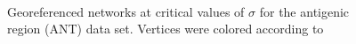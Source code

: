 \documentclass[12pt]{article}
\begin{document}
\begin{figure}[t]
\\
\caption{\footnotesize Georeferenced networks at critical values of $\sigma$ for the antigenic region (ANT) data set.
Vertices were colored according to}
\label{fig:netsANT}
\end{figure}
\bigskip
\bigskip
\end{document}
